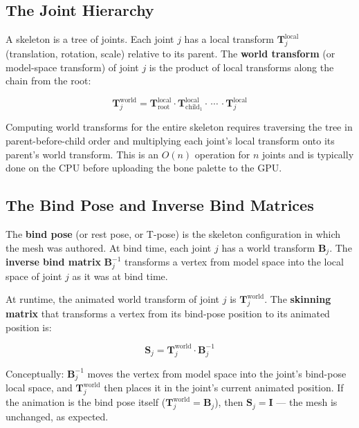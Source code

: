 \documentclass[
  11pt,
  letterpaper,
  DIV=11,
  numbers=noendperiod,
  twoside,
  open=right]{scrreprt}
\begin{document}
\subsection{The Joint Hierarchy}\label{the-joint-hierarchy}

A skeleton is a tree of joints. Each joint \(j\) has a local transform
\(\mathbf{T}_j^{\text{local}}\) (translation, rotation, scale) relative
to its parent. The \textbf{world transform} (or model-space transform)
of joint \(j\) is the product of local transforms along the chain from
the root:

\[
\mathbf{T}_j^{\text{world}} = \mathbf{T}_{\text{root}}^{\text{local}} \cdot \mathbf{T}_{\text{child}_1}^{\text{local}} \cdot \, \cdots \, \cdot \mathbf{T}_j^{\text{local}}
\]

Computing world transforms for the entire skeleton requires traversing
the tree in parent-before-child order and multiplying each joint's local
transform onto its parent's world transform. This is an \(O(n)\)
operation for \(n\) joints and is typically done on the CPU before
uploading the bone palette to the GPU.

\subsection{The Bind Pose and Inverse Bind
Matrices}\label{the-bind-pose-and-inverse-bind-matrices}

The \textbf{bind pose} (or rest pose, or T-pose) is the skeleton
configuration in which the mesh was authored. At bind time, each joint
\(j\) has a world transform \(\mathbf{B}_j\). The \textbf{inverse bind
matrix} \(\mathbf{B}_j^{-1}\) transforms a vertex from model space into
the local space of joint \(j\) as it was at bind time.

At runtime, the animated world transform of joint \(j\) is
\(\mathbf{T}_j^{\text{world}}\). The \textbf{skinning matrix} that
transforms a vertex from its bind-pose position to its animated position
is:

\[
\mathbf{S}_j = \mathbf{T}_j^{\text{world}} \cdot \mathbf{B}_j^{-1}
\]

Conceptually: \(\mathbf{B}_j^{-1}\) moves the vertex from model space
into the joint's bind-pose local space, and
\(\mathbf{T}_j^{\text{world}}\) then places it in the joint's current
animated position. If the animation is the bind pose itself
(\(\mathbf{T}_j^{\text{world}} = \mathbf{B}_j\)), then
\(\mathbf{S}_j = \mathbf{I}\) --- the mesh is unchanged, as expected.
\end{document}
